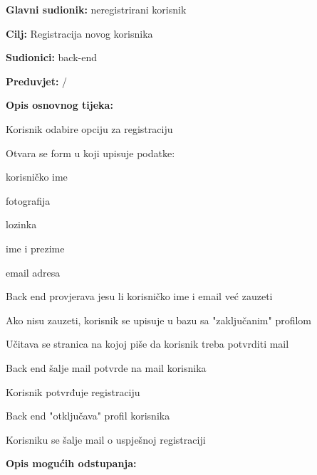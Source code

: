 						\noindent {}
					\begin{packed_item}
						
						\item \textbf{Glavni sudionik: } neregistrirani korisnik
						\item  \textbf{Cilj:} Registracija novog korisnika
						\item  \textbf{Sudionici:} back-end
						\item  \textbf{Preduvjet:}  / 
						\item  \textbf{Opis osnovnog tijeka:}
						
						\item[] \begin{packed_enum}
							\item Korisnik odabire opciju za registraciju
							\item Otvara se form u koji upisuje podatke:
								\item[] \begin{packed_enum}
									\item korisničko ime
									\item fotografija
									\item lozinka
									\item ime i prezime
									\item email adresa
								\end{packed_enum}
									
							\item Back end provjerava jesu li korisničko ime i email već zauzeti
							\item Ako nisu zauzeti, korisnik se upisuje u bazu sa "zaključanim" profilom
							\item Učitava se stranica na kojoj piše da korisnik treba potvrditi mail
							\item Back end šalje mail potvrde na mail korisnika
							\item Korisnik potvrđuje registraciju
							\item Back end "otključava" profil korisnika
							\item Korisniku se šalje mail o uspješnoj registraciji
						\end{packed_enum}
						
						\item  \textbf{Opis mogućih odstupanja:}
						
						\item[] \begin{packed_item}
							

\end{packed_item}
\end{packed_item}
